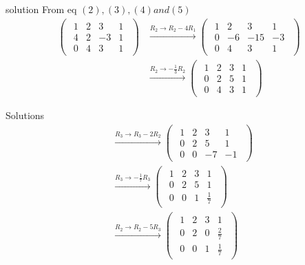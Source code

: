 \documentclass{beamer}
\begin{document}
\begin{frame}{solution}
From eq $(2),(3),(4)and (5)$
\begin{align}
\begin{pmatrix}
\begin{array}{ccc|c}
1 & 2 & 3 & 1\\
4 & 2 & -3 & 1\\
0 & 4 & 3 & 1
\end{array}
\end{pmatrix}
&\xrightarrow{R_2 \to R_2 - 4R_1}
\begin{pmatrix}
\begin{array}{ccc|c}
1 & 2 & 3 & 1\\
0 & -6 & -15 & -3\\
0 & 4 & 3 & 1
\end{array}
\end{pmatrix} \\[4pt]
&\xrightarrow{R_2 \to -\tfrac{1}{3}R_2}
\begin{pmatrix}
\begin{array}{ccc|c}
1 & 2 & 3 & 1\\
0 & 2 & 5 & 1\\
0 & 4 & 3 & 1
\end{array}
\end{pmatrix} 
\end{align}
\end{frame}
\begin{frame}{Solutions}
    \begin{align}
&\xrightarrow{R_3 \to R_3 - 2R_2}
\begin{pmatrix}
\begin{array}{ccc|c}
1 & 2 & 3 & 1\\
0 & 2 & 5 & 1\\
0 & 0 & -7 & -1
\end{array}
\end{pmatrix} \\[4pt]
&\xrightarrow{R_3 \to -\tfrac{1}{7}R_3}
\begin{pmatrix}
\begin{array}{ccc|c}
1 & 2 & 3 & 1\\
0 & 2 & 5 & 1\\
0 & 0 & 1 & \tfrac{1}{7}
\end{array}
\end{pmatrix} \\[4pt]
&\xrightarrow{R_2 \to R_2 - 5R_3}
\begin{pmatrix}
\begin{array}{ccc|c}
1 & 2 & 3 & 1\\
0 & 2 & 0 & \tfrac{2}{7}\\
0 & 0 & 1 & \tfrac{1}{7}
\end{array}
\end{pmatrix} 
\end{align}
\end{frame}
\end{document}
